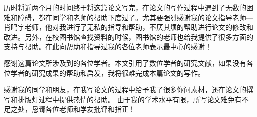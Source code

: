 
历时将近两个月的时间终于将这篇论文写完，在论文的写作过程中遇到了无数的困难和障碍，都在同学和老师的帮助下度过了。尤其要强烈感谢我的论文指导老师—肖鸣宇老师，他对我进行了无私的指导和帮助，不厌其烦的帮助进行论文的修改和改进。另外，在校图书馆查找资料的时候，图书馆的老师也给我提供了很多方面的支持与帮助。在此向帮助和指导过我的各位老师表示最中心的感谢！

感谢这篇论文所涉及到的各位学者。本文引用了数位学者的研究文献，如果没有各位学者的研究成果的帮助和启发，我将很难完成本篇论文的写作。

感谢我的同学和朋友，在我写论文的过程中给予我了很多你问素材，还在论文的撰写和排版灯过程中提供热情的帮助。
由于我的学术水平有限，所写论文难免有不足之处，恳请各位老师和学友批评和指正！
